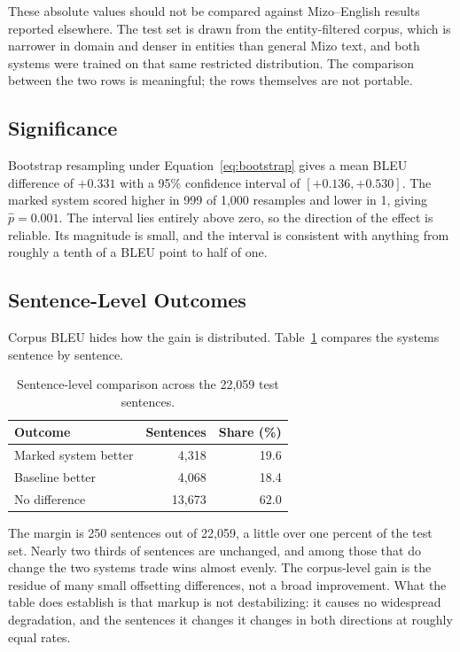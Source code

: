 \documentclass[acmsmall,screen,review]{acmart}
\begin{document}
These absolute values should not be compared against Mizo--English results
reported elsewhere. The test set is drawn from the entity-filtered corpus, which
is narrower in domain and denser in entities than general Mizo text, and both
systems were trained on that same restricted distribution. The comparison
between the two rows is meaningful; the rows themselves are not portable.

\subsection{Significance}
\label{sec:mtresults:significance}

Bootstrap resampling under Equation~\eqref{eq:bootstrap} gives a mean BLEU
difference of $+0.331$ with a 95\% confidence interval of $[+0.136, +0.530]$.
The marked system scored higher in 999 of 1,000 resamples and lower in 1, giving
$\hat{p} = 0.001$. The interval lies entirely above zero, so the direction of
the effect is reliable. Its magnitude is small, and the interval is consistent
with anything from roughly a tenth of a BLEU point to half of one.

\subsection{Sentence-Level Outcomes}
\label{sec:mtresults:sentence}

Corpus BLEU hides how the gain is distributed.
Table~\ref{tab:sentence_level} compares the systems sentence by sentence.

\begin{table}[htbp]
\centering
\caption{Sentence-level comparison across the 22,059 test sentences.}
\label{tab:sentence_level}
\begin{tabular}{lrr}
\hline
\textbf{Outcome} & \textbf{Sentences} & \textbf{Share (\%)} \\
\hline
Marked system better & 4,318 & 19.6 \\
Baseline better      & 4,068 & 18.4 \\
No difference        & 13,673 & 62.0 \\
\hline
\end{tabular}
\end{table}

The margin is 250 sentences out of 22,059, a little over one percent of the test
set. Nearly two thirds of sentences are unchanged, and among those that do
change the two systems trade wins almost evenly. The corpus-level gain is the
residue of many small offsetting differences, not a broad improvement. What the
table does establish is that markup is not destabilizing: it causes no
widespread degradation, and the sentences it changes it changes in both
directions at roughly equal rates.
\end{document}
